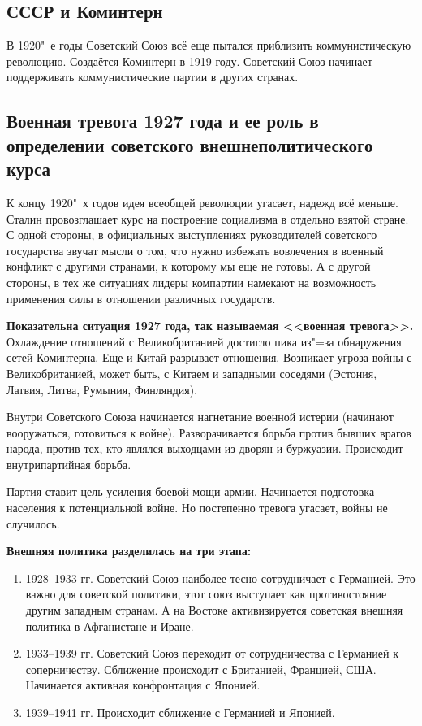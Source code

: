 \subsection{СССР и Коминтерн}

В 1920"~е годы Советский Союз всё еще пытался приблизить коммунистическую революцию. Создаётся Коминтерн в 1919 году. Советский Союз начинает поддерживать коммунистические партии в других странах. 

\subsection{Военная тревога 1927 года и ее роль в определении советского внешнеполитического курса}

К концу 1920"~х годов идея всеобщей революции угасает, надежд всё меньше. Сталин провозглашает курс на построение социализма в отдельно взятой стране. С одной стороны, в официальных выступлениях руководителей советского государства звучат мысли о том, что нужно избежать вовлечения в военный конфликт с другими странами, к которому мы еще не готовы. А с другой стороны, в тех же ситуациях лидеры компартии намекают на возможность применения силы в отношении различных государств.

\textbf{Показательна ситуация 1927 года, так называемая <<военная тревога>>.} Охлаждение отношений с Великобританией достигло пика из"=за обнаружения сетей Коминтерна. Еще и Китай разрывает отношения. Возникает угроза войны с Великобританией, может быть, с Китаем и западными соседями (Эстония, Латвия, Литва, Румыния, Финляндия). 

Внутри Советского Союза начинается нагнетание военной истерии (начинают вооружаться, готовиться к войне). Разворачивается борьба против бывших врагов народа, против тех, кто являлся выходцами из дворян и буржуазии. Происходит внутрипартийная борьба.

Партия ставит цель усиления боевой мощи армии. Начинается подготовка населения к потенциальной войне. Но постепенно тревога угасает, войны не случилось. 

\textbf{Внешняя политика разделилась на три этапа:}

\begin{enumerate}
    \item 1928--1933 гг. Советский Союз наиболее тесно сотрудничает с Германией. Это важно для советской политики, этот союз выступает как противостояние другим западным странам. А на Востоке активизируется советская внешняя политика в Афганистане и Иране.
    \item 1933--1939 гг. Советский Союз переходит от сотрудничества с Германией к соперничеству. Сближение происходит с Британией, Францией, США. Начинается активная конфронтация с Японией.
    \item 1939--1941 гг. Происходит сближение с Германией и Японией.
\end{enumerate}

